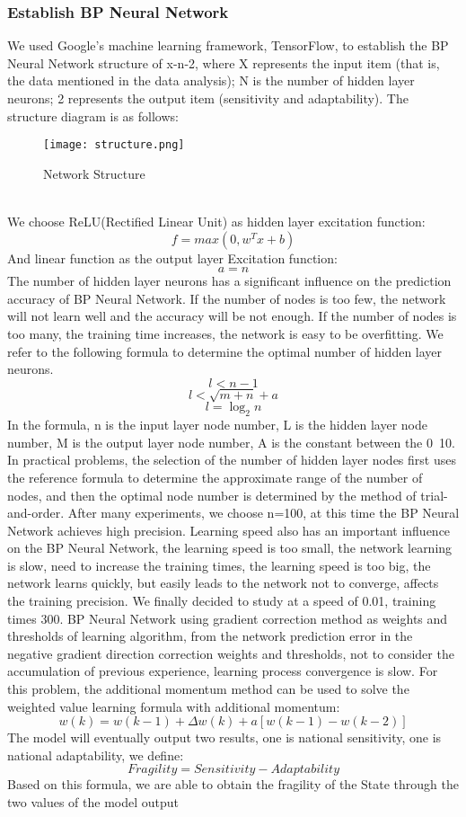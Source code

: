 \documentclass{mcmthesis}
\begin{document}
\subsubsection{Establish BP Neural Network}
We used Google's machine learning framework, TensorFlow, to establish the BP 
Neural Network structure of x-n-2, where X represents the input item (that is, 
the data mentioned in the data analysis); N is the number of hidden layer neurons; 2 
represents the output item (sensitivity and adaptability). The structure diagram is 
as follows:
\begin{figure}[h]
\small
\centering
\texttt{[image: structure.png]}
\caption{Network Structure} 
\label{fig:ns}
\end{figure}\\
\newpage
We choose ReLU(Rectified Linear Unit) as hidden layer excitation function:
\[ f=max\left ( 0,w^{T}x+b \right ) \]
And linear function as the output layer Excitation function:
\[ a=n \]
The number of hidden layer neurons has a significant influence on 
the prediction accuracy of BP Neural Network. If the number of 
nodes is too few, the network will not learn well and the accuracy 
will be not enough. If the number of nodes is too many, the 
training time increases, the network is easy to be overfitting. 
We refer to the following formula to determine the optimal number 
of hidden layer neurons.
\[ l< n-1 \]
\[ l<\sqrt{m+n}+a \]
\[ l=\log_{2} n \]
In the formula, n is the input layer node number, L is the hidden 
layer node number, M is the output layer node number, A is the constant 
between the 0~10. In practical problems, the selection of the number 
of hidden layer nodes first uses the reference formula to determine 
the approximate range of the number of nodes, and then the optimal 
node number is determined by the method of trial-and-order. After 
many experiments, we choose n=100, at this time the BP Neural Network 
achieves high precision. Learning speed also has an important influence 
on the BP Neural Network, the learning speed is too small, the 
network learning is slow, need to increase the training times, the 
learning speed is too big, the network learns quickly, but easily 
leads to the network not to converge, affects the training precision. 
We finally decided to study at a speed of 0.01, training times 300. 
BP Neural Network using gradient correction method as weights and 
thresholds of learning algorithm, from the network prediction error 
in the negative gradient direction correction weights and thresholds, 
not to consider the accumulation of previous experience, learning 
process convergence is slow. For this problem, the additional momentum 
method can be used to solve the weighted value learning formula 
with additional momentum:
\[ w\left ( k \right )=
w\left ( k-1 \right )+\Delta w\left 
( k \right )+a\left [ w\left ( k-1 \right )-w\left 
( k-2 \right ) \right ] \]
The model will eventually output two results, one is national 
sensitivity, one is national adaptability, we define:
\[ Fragility = Sensitivity - Adaptability \]
Based on this formula, we are able to obtain the 
fragility of the State through the two values of the model output
\end{document}
